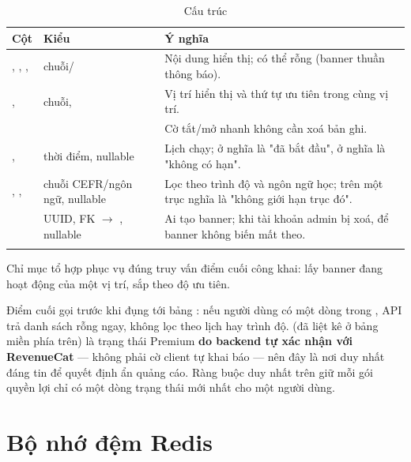 \begin{longtable}{L{4.0cm} L{3.0cm} L{6.6cm}}
\toprule
\textbf{Cột} & \textbf{Kiểu} & \textbf{Ý nghĩa}\\
\midrule
\endhead
{}, , ,  & chuỗi/ & Nội dung hiển thị;  có thể rỗng (banner thuần thông báo).\\
,  & chuỗi,  & Vị trí hiển thị và thứ tự ưu tiên trong cùng vị trí.\\
 &  & Cờ tắt/mở nhanh không cần xoá bản ghi.\\
,  & thời điểm, nullable & Lịch chạy;  ở  nghĩa là "đã bắt đầu",  ở  nghĩa là "không có hạn".\\
, ,  & chuỗi CEFR/ngôn ngữ, nullable & Lọc theo trình độ và ngôn ngữ học;  trên một trục nghĩa là "không giới hạn trục đó".\\
 & UUID, FK $\to$ , nullable & Ai tạo banner;  khi tài khoản admin bị xoá, để banner không biến mất theo.\\
\bottomrule
\caption{Cấu trúc }
\end{longtable}

Chỉ mục tổ hợp  phục vụ đúng truy vấn điểm cuối
công khai: lấy banner đang hoạt động của một vị trí, sắp theo độ ưu tiên.

\begin{luuy}
Điểm cuối  gọi  trước khi
đụng tới bảng : nếu người dùng có một dòng  trong
, API trả danh sách rỗng ngay, không lọc theo lịch hay trình độ.
 (đã liệt kê ở bảng miền  phía trên) là trạng
thái Premium \textbf{do backend tự xác nhận với RevenueCat} — không phải cờ client tự
khai báo — nên đây là nơi duy nhất đáng tin để quyết định ẩn quảng cáo. Ràng buộc duy nhất
trên  giữ mỗi gói quyền lợi chỉ có một dòng trạng thái
mới nhất cho một người dùng.
\end{luuy}

\section{Bộ nhớ đệm Redis}

